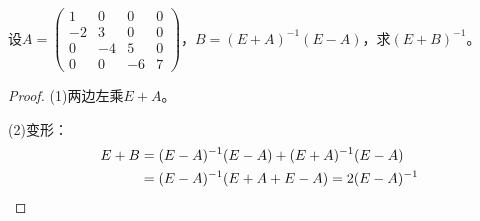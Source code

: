\begin{theorem}
	设$A=
	\begin{pmatrix}
		1 & 0 & 0 & 0 \\
		-2 & 3 & 0 & 0 \\
		0 & -4 & 5 & 0 \\
		0 & 0 & -6 & 7
	\end{pmatrix}$，$B=(E+A)^{-1}(E-A)$，求$(E+B)^{-1}$。
\end{theorem}
\begin{proof}
	(1)两边左乘$E+A$。\par
	(2)变形：
	\begin{align*}
		E+B&=(E-A)^{-1}(E-A)+(E+A)^{-1}(E-A) \\
		&=(E-A)^{-1}(E+A+E-A)=2(E-A)^{-1}\qedhere
	\end{align*}
\end{proof}
